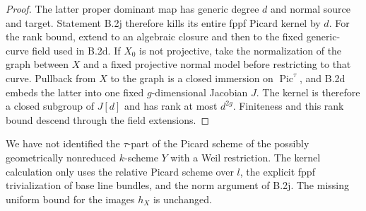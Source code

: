 \begin{proof}
The latter proper dominant map has generic degree $d$ and normal
source and target.  Statement B.2j therefore kills its entire
fppf Picard kernel by $d$.  For the rank bound, extend to an
algebraic closure and then to the fixed generic-curve field used
in B.2d.  If $X_0$ is not projective, take the normalization of
the graph between $X$ and a fixed projective normal model before
restricting to that curve.  Pullback from $X$ to the graph is a
closed immersion on $\operatorname{Pic}^{\tau}$, and B.2d embeds
the latter into one fixed $g$-dimensional Jacobian $J$.
The kernel is therefore a closed subgroup of $J[d]$ and has
rank at most $d^{2g}$.  Finiteness and this rank bound descend
through the field extensions.
\end{proof}

\begin{remark}
We have not identified the $\tau$-part of the Picard scheme of
the possibly geometrically nonreduced $k$-scheme $Y$ with a Weil
restriction.  The kernel calculation only uses the relative
Picard scheme over $l$, the explicit fppf trivialization of base
line bundles, and the norm argument of B.2j.  The missing uniform
bound for the images $h_X$ is unchanged.
\end{remark}
